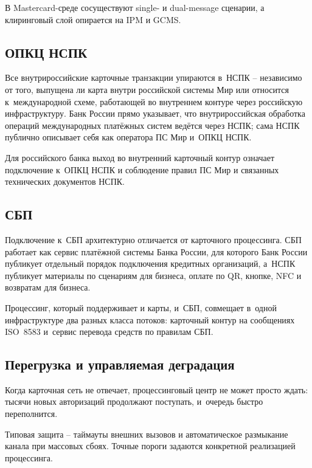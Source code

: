 В Mastercard-среде
сосуществуют single- и dual-message сценарии, а клиринговый
слой опирается на IPM и GCMS.~\cite{mc-switching-services,mc-tpr}

\subsection*{ОПКЦ НСПК}

Все внутрироссийские карточные транзакции упираются в~НСПК --
независимо от того, выпущена ли карта внутри российской системы
Мир или относится к~международной схеме, работающей во внутреннем
контуре через российскую инфраструктуру. Банк России прямо
указывает, что внутрироссийская обработка операций международных
платёжных систем ведётся через НСПК; сама НСПК публично описывает
себя как оператора ПС Мир и~ОПКЦ НСПК.~\cite{cbr-national-payment-system,nspk-about-company}

Для российского банка выход во внутренний
карточный контур означает подключение
к~ОПКЦ НСПК и соблюдение правил ПС Мир и связанных
технических документов НСПК.~\cite{nspk-mir-rules}

\subsection*{СБП}

Подключение к~СБП архитектурно отличается от карточного
процессинга. СБП работает как сервис платёжной системы Банка России,
для которого Банк России публикует отдельный порядок
подключения кредитных организаций, а~НСПК публикует
материалы по сценариям для бизнеса, оплате по QR, кнопке, NFC
и возвратам для бизнеса.~\cite{cbr-sbp-actions,sbp-main,sbp-faq-business}

Процессинг, который поддерживает и карты, и~СБП,
совмещает в~одной инфраструктуре два разных класса потоков:
карточный контур на сообщениях ISO~8583 и~сервис перевода средств
по правилам СБП.~\cite{cbr-sbp-actions,sbp-main}

\subsection*{Перегрузка и управляемая деградация}

Когда карточная сеть не отвечает, процессинговый центр не может
просто ждать: тысячи новых авторизаций продолжают поступать,
и~очередь быстро переполнится.

Типовая защита -- таймауты внешних вызовов и автоматическое
размыкание канала при массовых сбоях. Точные пороги задаются
конкретной реализацией процессинга.

